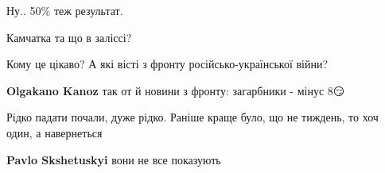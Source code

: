 \begin{itemize}
 
Ну.. 50\% теж результат.

 
Камчатка та що в заліссі?

 

Кому це цікаво? А які вісті з фронту російсько-української війни?

\begin{itemize}
 
\textbf{Olgakano Kanoz} так от й новини з фронту: загарбники - мінус 8😏
\end{itemize}


Рідко падати почали, дуже рідко. Раніше краще було, що не тиждень, то хоч один,
а навернеться

\begin{itemize}
 
\textbf{Pavlo Skshetuskyi} вони не все показують

\begin{itemize}
 

\end{itemize}
\end{itemize}
\end{itemize}
